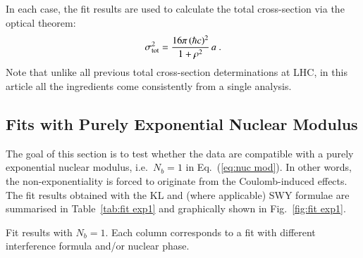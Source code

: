 In each case, the fit results are used to calculate the total cross-section via the optical theorem:
\begin{equation}
\label{eq:si tot}
\sigma_{\rm tot}^2 = {16\pi\, (\hbar c)^2\over 1 + \rho^2}\, a\ .
\end{equation}
Note that unlike all previous total cross-section determinations at LHC, in this article all the ingredients come consistently from a single analysis.


\subsection{Fits with Purely Exponential Nuclear Modulus}
\label{sec:fit exp1}

The goal of this section is to test whether the data are compatible with a purely exponential nuclear modulus, i.e.~$N_b=1$ in Eq.~(\ref{eq:nuc mod}). In other words, the non-exponentiality is forced to originate from the Coulomb-induced effects. The fit results obtained with the KL and (where applicable) SWY formulae are summarised in Table~\ref{tab:fit exp1} and graphically shown in Fig.~\ref{fig:fit exp1}.

\begin{table}
\caption{Fit results with $N_b=1$. Each column corresponds to a fit with different interference formula and/or nuclear phase.}
\vskip-3mm
\label{tab:fit exp1}
\begin{center}
\setlength\tabcolsep{2.5mm}

\end{center}
\end{table}

